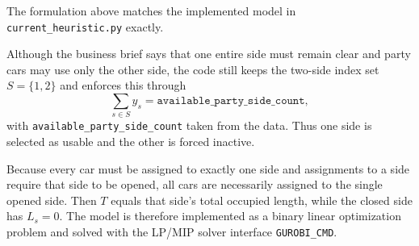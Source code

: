 The formulation above matches the implemented model in \texttt{current\_heuristic.py} exactly.

Although the business brief says that one entire side must remain clear and party cars may use only the other side, the code still keeps the two-side index set \(S=\{1,2\}\) and enforces this through
\[
\sum_{s\in S} y_s = \texttt{available\_party\_side\_count},
\]
with \texttt{available\_party\_side\_count} taken from the data. Thus one side is selected as usable and the other is forced inactive.

Because every car must be assigned to exactly one side and assignments to a side require that side to be opened, all cars are necessarily assigned to the single opened side. Then \(T\) equals that side's total occupied length, while the closed side has \(L_s=0\). The model is therefore implemented as a binary linear optimization problem and solved with the LP/MIP solver interface \texttt{GUROBI\_CMD}.
